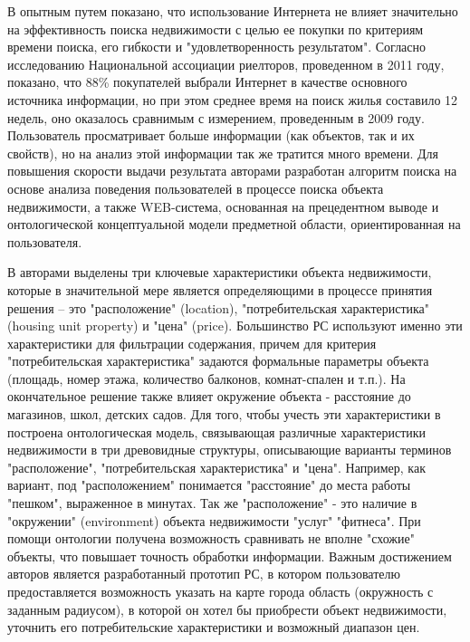 \documentclass[a4paper,14pt,openany,final]{extreport} %
\begin{document}
В \cite{b16} опытным путем показано, что использование Интернета не влияет значительно на эффективность поиска недвижимости с целью ее покупки по критериям времени поиска, его гибкости и "удовлетворенность результатом". Согласно исследованию Национальной ассоциации риелторов, проведенном в 2011 году, показано, что 88\% покупателей выбрали Интернет в качестве основного источника информации, но при этом среднее время на поиск жилья составило 12 недель, оно оказалось сравнимым с измерением, проведенным в 2009 году. Пользователь просматривает больше информации (как объектов, так и их свойств), но на анализ этой информации так же тратится много времени. Для повышения скорости выдачи результата авторами разработан алгоритм поиска на основе анализа поведения пользователей в процессе поиска объекта недвижимости, а также WEB-система, основанная на прецедентном выводе и онтологической концептуальной модели предметной области, ориентированная на пользователя.

В \cite{b23} авторами выделены три ключевые характеристики объекта недвижимости, которые в значительной мере является определяющими в процессе принятия решения – это "расположение" (location), "потребительская характеристика" (housing unit property) и "цена" (price). Большинство РС используют именно эти характеристики для фильтрации содержания, причем для критерия "потребительская характеристика" задаются формальные параметры объекта (площадь, номер этажа, количество балконов, комнат-спален и т.п.). На окончательное решение также влияет окружение объекта - расстояние до магазинов, школ, детских садов. Для того, чтобы учесть эти характеристики в \cite{b16} построена онтологическая модель, связывающая различные характеристики недвижимости в три древовидные структуры, описывающие варианты терминов "расположение", "потребительская характеристика" и "цена". Например, как вариант, под "расположением" понимается "расстояние" до места работы "пешком", выраженное в минутах. Так же "расположение" - это наличие в "окружении" (environment) объекта недвижимости "услуг" "фитнеса". При помощи онтологии получена возможность сравнивать не вполне "схожие" объекты, что повышает точность обработки информации.
Важным достижением авторов \cite{b16} является разработанный прототип РС, в котором пользователю предоставляется возможность указать на карте города область (окружность с заданным радиусом), в которой он хотел бы приобрести объект недвижимости, уточнить его потребительские характеристики и возможный диапазон цен.
\end{document}

